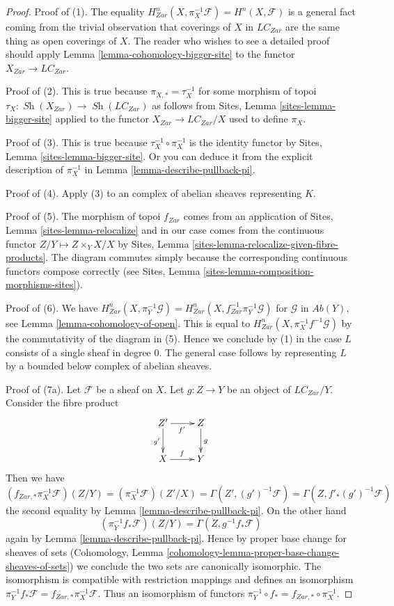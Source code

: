 \documentclass[10pt,a4paper]{amsart}
\theoremstyle{plain}
\theoremstyle{definition}
\theoremstyle{remark}
\numberwithin{equation}{subsection}
\def\Sh{\mathop{\mathit{Sh}}\nolimits}
\begin{document}
\begin{proof}
Proof of (1).
The equality $H^n_{Zar}(X, \pi_X^{-1}\mathcal{F}) = H^n(X, \mathcal{F})$
is a general fact coming from the trivial observation that
coverings of $X$ in $\textit{LC}_{Zar}$ are the same thing as open
coverings of $X$. The reader who wishes to see a detailed proof
should apply Lemma \ref{lemma-cohomology-bigger-site} to the functor
$X_{Zar} \to \textit{LC}_{Zar}$.

\medskip\noindent
Proof of (2). This is true because $\pi_{X, *} = \tau_X^{-1}$
for some morphism of topoi $\tau_X : \Sh(X_{Zar}) \to \Sh(\textit{LC}_{Zar})$
as follows from Sites, Lemma \ref{sites-lemma-bigger-site}
applied to the functor
$X_{Zar} \to \textit{LC}_{Zar}/X$ used to define $\pi_X$.

\medskip\noindent
Proof of (3). This is true because $\tau_X^{-1} \circ \pi_X^{-1}$
is the identity functor by Sites, Lemma \ref{sites-lemma-bigger-site}.
Or you can deduce it from the explicit description of
$\pi_X^{-1}$ in Lemma \ref{lemma-describe-pullback-pi}.

\medskip\noindent
Proof of (4). Apply (3) to an complex of abelian sheaves representing $K$.

\medskip\noindent
Proof of (5). The morphism of topoi $f_{Zar}$ comes from an application of
Sites, Lemma \ref{sites-lemma-relocalize}
and in our case comes from the continuous functor
$Z/Y \mapsto Z \times_Y X/X$ by
Sites, Lemma \ref{sites-lemma-relocalize-given-fibre-products}.
The diagram commutes simply because the corresponding
continuous functors compose correctly
(see Sites, Lemma \ref{sites-lemma-composition-morphisms-sites}).

\medskip\noindent
Proof of (6). We have
$H^n_{Zar}(X, \pi_Y^{-1}\mathcal{G}) =
H^n_{Zar}(X, f_{Zar}^{-1}\pi_Y^{-1}\mathcal{G})$
for $\mathcal{G}$ in $\textit{Ab}(Y)$, see
Lemma \ref{lemma-cohomology-of-open}.
This is equal to $H^n_{Zar}(X, \pi_X^{-1}f^{-1}\mathcal{G})$
by the commutativity of the diagram in (5).
Hence we conclude by (1) in the case $L$ consists of a single
sheaf in degree $0$. The general case follows by representing
$L$ by a bounded below complex of abelian sheaves.

\medskip\noindent
Proof of (7a). Let $\mathcal{F}$ be a sheaf on $X$.
Let $g : Z \to Y$ be an object of $\textit{LC}_{Zar}/Y$. Consider the
fibre product
$$
\xymatrix{
Z' \ar[r]_{f'} \ar[d]_{g'} & Z \ar[d]^g \\
X \ar[r]^f & Y
}
$$
Then we have
$$
(f_{Zar, *}\pi_X^{-1}\mathcal{F})(Z/Y) =
(\pi_X^{-1}\mathcal{F})(Z'/X)  =
\Gamma(Z', (g')^{-1}\mathcal{F})  =
\Gamma(Z, f'_*(g')^{-1}\mathcal{F})
$$
the second equality by Lemma \ref{lemma-describe-pullback-pi}.
On the other hand
$$
(\pi_Y^{-1}f_*\mathcal{F})(Z/Y) = \Gamma(Z, g^{-1}f_*\mathcal{F})
$$
again by Lemma \ref{lemma-describe-pullback-pi}.
Hence by proper base change for sheaves of sets
(Cohomology, Lemma \ref{cohomology-lemma-proper-base-change-sheaves-of-sets})
we conclude the two sets are canonically isomorphic.
The isomorphism is compatible with restriction mappings
and defines an isomorphism
$\pi_Y^{-1}f_*\mathcal{F} = f_{Zar, *}\pi_X^{-1}\mathcal{F}$.
Thus an isomorphism of functors
$\pi_Y^{-1} \circ f_* = f_{Zar, *} \circ \pi_X^{-1}$.


\end{proof}
\end{document}
